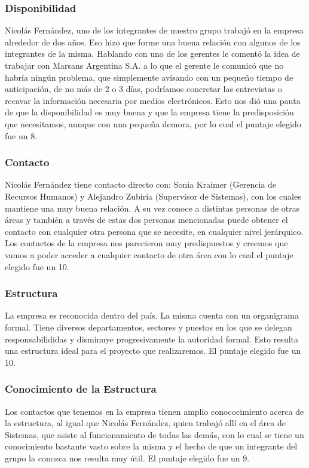 \documentclass[12pt,a4paper,spanish]{article}
\begin{document}
\subsubsection{Disponibilidad}
Nicol\'{a}s Fern\'andez, uno de los integrantes de nuestro grupo trabaj\'{o} en la empresa alrededor de dos a\~nos. Eso hizo que forme una buena relaci\'{o}n con algunos de los integrantes de la misma. Hablando con uno de los gerentes le coment\'{o} la idea de trabajar con Marsans Argentina S.A. a lo que el gerente le comunic\'{o} que no habr\'{i}a ning\'{u}n problema, que simplemente avisando con un peque\~no tiempo de anticipaci\'on, de no m\'{a}s de 2 o 3 d\'{i}as, podr\'{i}amos concretar las entrevistas o recavar la informaci\'on necesaria por medios electr\'onicos. Esto nos di\'{o} una pauta de que la disponibilidad es muy buena y que la empresa tiene la predisposici\'{o}n que necesitamos, aunque con una peque\~na demora, por lo cual el puntaje elegido fue un 8.

\subsubsection{Contacto}
Nicol\'{a}s Fern\'andez tiene contacto directo con: Sonia Kraimer (Gerencia de Recursos Humanos) y Alejandro Zubiria (Supervisor de Sistemas), con los cuales mantiene una muy buena relaci\'{o}n. A su vez conoce a distintas personas de otras \'{a}reas y tambi\'{e}n a trav\'{e}s de estas dos personas mencionadas puede obtener el contacto con cualquier otra persona que se necesite, en cualquier nivel jer\'arquico. Los contactos de la empresa nos parecieron muy predispuestos y creemos que vamos a poder acceder a cualquier contacto de otra \'{a}rea con lo cual el puntaje elegido fue un 10.

\subsubsection{Estructura}
La empresa es reconocida dentro del pa\'{i}s. La misma cuenta con un organigrama formal. Tiene diversos departamentos, sectores y puestos en los que se delegan responsabilididas y disminuye progresivamente la autoridad formal. Esto resulta una estructura ideal para el proyecto que realizaremos. El puntaje elegido fue un 10.

\subsubsection{Conocimiento de la Estructura}
Los contactos que tenemos en la empresa tienen amplio conococimiento acerca de la estructura, al igual que Nicol\'{a}s Fern\'andez, quien trabaj\'{o} all\'{i} en el \'area de Sistemas, que asiste al funcionamiento de todas las dem\'as, con lo cual se tiene un conocimiento bastante vasto sobre la misma y el hecho de que un integrante del grupo la conozca nos resulta muy \'{u}til. El puntaje elegido fue un 9.
\end{document}

